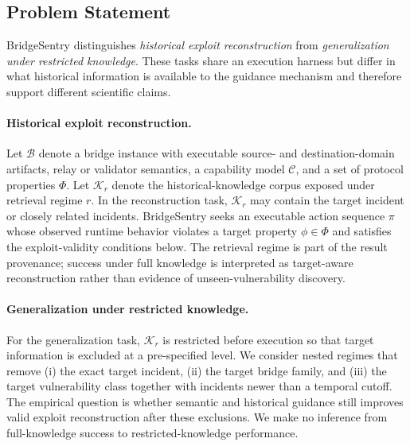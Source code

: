 
\subsection{Problem Statement}\label{sec:problem-statement}

BridgeSentry distinguishes \emph{historical exploit reconstruction} from \emph{generalization under restricted knowledge}. These tasks share an execution harness but differ in what historical information is available to the guidance mechanism and therefore support different scientific claims.

\paragraph{Historical exploit reconstruction.}
Let $\mathcal{B}$ denote a bridge instance with executable source- and destination-domain artifacts, relay or validator semantics, a capability model $\mathcal{C}$, and a set of protocol properties $\Phi$. Let $\mathcal{K}_r$ denote the historical-knowledge corpus exposed under retrieval regime $r$. In the reconstruction task, $\mathcal{K}_r$ may contain the target incident or closely related incidents. BridgeSentry seeks an executable action sequence $\pi$ whose observed runtime behavior violates a target property $\phi\in\Phi$ and satisfies the exploit-validity conditions below. The retrieval regime is part of the result provenance; success under full knowledge is interpreted as target-aware reconstruction rather than evidence of unseen-vulnerability discovery.

\paragraph{Generalization under restricted knowledge.}
For the generalization task, $\mathcal{K}_r$ is restricted before execution so that target information is excluded at a pre-specified level. We consider nested regimes that remove (i) the exact target incident, (ii) the target bridge family, and (iii) the target vulnerability class together with incidents newer than a temporal cutoff. The empirical question is whether semantic and historical guidance still improves valid exploit reconstruction after these exclusions. We make no inference from full-knowledge success to restricted-knowledge performance.

